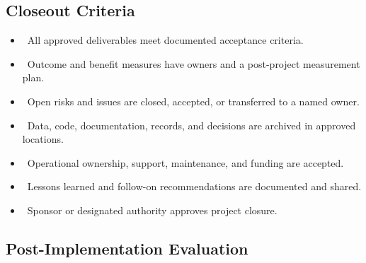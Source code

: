 \subsection{Closeout Criteria}
\begin{itemize}
  \item \checkbox\ All approved deliverables meet documented acceptance criteria.
  \item \checkbox\ Outcome and benefit measures have owners and a post-project measurement plan.
  \item \checkbox\ Open risks and issues are closed, accepted, or transferred to a named owner.
  \item \checkbox\ Data, code, documentation, records, and decisions are archived in approved locations.
  \item \checkbox\ Operational ownership, support, maintenance, and funding are accepted.
  \item \checkbox\ Lessons learned and follow-on recommendations are documented and shared.
  \item \checkbox\ Sponsor or designated authority approves project closure.
\end{itemize}

\subsection{Post-Implementation Evaluation}
